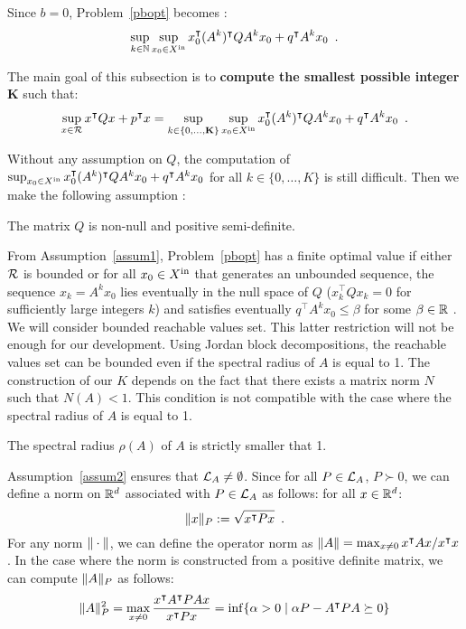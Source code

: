 \documentclass[10pt]{article}
\begin{document}
Since $b=0$, Problem~\eqref{pbopt} becomes :
\[
\sup_{k\in\mathbb{N}}\sup_{x_0\in X^\mathrm{in}} x_0^\intercal (A^k)^\intercal Q A^k x_0+q^\intercal A^k x_0\enspace .
\]

The main goal of this subsection is to {\bf compute the smallest possible integer} $\mathbf K$ such that:
\[
 \sup_{x\in\mathcal{R}} x^\intercal Q x+p^\intercal x=\sup_{k\in\{0,\ldots,\mathbf K\}}\sup_{x_0\in X^\mathrm{in}} x_0^\intercal (A^k)^\intercal Q A^k x_0+q^\intercal A^k x_0\enspace .
\]

Without any assumption on $Q$, the computation of  $\sup_{x_0\in X^\mathrm{in}} x_0^\intercal (A^k)^\intercal Q A^k x_0+q^\intercal A^k x_0$ for all $k\in\{0,\ldots,K\}$ is still difficult. Then we make the following assumption : 
\begin{assumption}
\label{assum1}
The matrix $Q$ is non-null and positive semi-definite.
\end{assumption}

From Assumption~\ref{assum1}, Problem~\eqref{pbopt} has a finite optimal value if either $\mathcal{R}$ is bounded or for all 
$x_0\in X^\mathrm{in}$ that generates an unbounded sequence, the sequence $x_k=A^k x_0$ lies eventually in the null space of $Q$ ($x_k^\intercal Q x_k=0$ for sufficiently large integers $k$) and satisfies eventually $q^\intercal A^k x_0\leq \beta$ for some $\beta\in\mathbb R$ .  We will consider bounded reachable values set. This latter restriction will not be enough for our development. Using Jordan block decompositions, the reachable values set can be bounded even if the spectral radius of $A$ is equal to 1. The construction of our $K$ depends on the fact that there exists a matrix norm $N$ such that $N(A)<1$. This condition is not compatible with the case where the spectral radius of $A$ is equal to 1.

\begin{assumption}
\label{assum2}
The spectral radius $\rho(A)$ of $A$ is strictly smaller that 1.
\end{assumption}

Assumption~\ref{assum2} ensures that $\mathcal{L}_{A}\neq \emptyset$. Since for all $P\in\mathcal{L}_{A}$, $P\succ 0$, we can define a norm on $\mathbb R^d$ associated with $P\in\mathcal{L}_{A}$ as follows: for all $x\in\mathbb R^d$:
\[\| x\|_P:=\sqrt{x^\intercal P x}\enspace. \]
For any norm $\| \cdot\|$, we can define the operator norm as $\| A\|=\max_{x\neq 0} x^\intercal A x/ x^\intercal x$. In the case where the norm is constructed from a positive definite matrix, we can compute $\| A\|_P$ as follows:
\begin{equation}
\label{normdef}
    \| A\|_P^2=\max_{x\neq 0} \dfrac{x^\intercal A^\intercal P A x}{x^\intercal P x}=\inf\{\alpha>0\mid \alpha P-A^\intercal P A\succeq 0\}
\end{equation}
\end{document}
